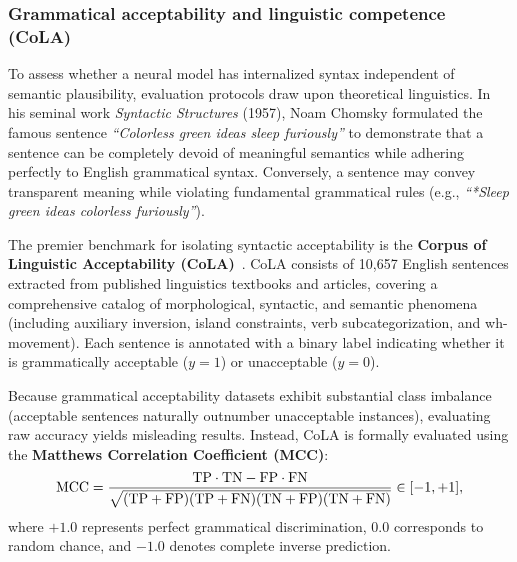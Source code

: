 \documentclass[../../../main.tex]{subfiles}
\begin{document}
\subsubsection{Grammatical acceptability and linguistic competence (CoLA)}
\label{subsec:nli_grammatical_acceptability}
To assess whether a neural model has internalized syntax independent of semantic plausibility, evaluation protocols draw upon theoretical linguistics. In his seminal work \textit{Syntactic Structures} (1957), Noam Chomsky formulated the famous sentence \textit{``Colorless green ideas sleep furiously''} to demonstrate that a sentence can be completely devoid of meaningful semantics while adhering perfectly to English grammatical syntax. Conversely, a sentence may convey transparent meaning while violating fundamental grammatical rules (e.g., \textit{``*Sleep green ideas colorless furiously''}).

The premier benchmark for isolating syntactic acceptability is the \textbf{Corpus of Linguistic Acceptability (CoLA)}~\cite{warstadt2019cola}. CoLA consists of 10,657 English sentences extracted from published linguistics textbooks and articles, covering a comprehensive catalog of morphological, syntactic, and semantic phenomena (including auxiliary inversion, island constraints, verb subcategorization, and wh-movement). Each sentence is annotated with a binary label indicating whether it is grammatically acceptable ($y = 1$) or unacceptable ($y = 0$).

Because grammatical acceptability datasets exhibit substantial class imbalance (acceptable sentences naturally outnumber unacceptable instances), evaluating raw accuracy yields misleading results. Instead, CoLA is formally evaluated using the \textbf{Matthews Correlation Coefficient (MCC)}:
\begin{equation}
\label{eq:mcc_def}
\text{MCC} = \frac{\mathrm{TP} \cdot \mathrm{TN} - \mathrm{FP} \cdot \mathrm{FN}}{\sqrt{(\mathrm{TP} + \mathrm{FP})(\mathrm{TP} + \mathrm{FN})(\mathrm{TN} + \mathrm{FP})(\mathrm{TN} + \mathrm{FN})}} \in [-1, +1],
\end{equation}
where $+1.0$ represents perfect grammatical discrimination, $0.0$ corresponds to random chance, and $-1.0$ denotes complete inverse prediction.
\end{document}
